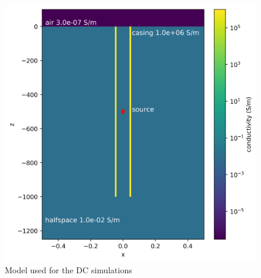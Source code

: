 \begin{figure}[htb]
    \begin{center}
    \includegraphics[width=0.4\columnwidth]{figures/kaufman_setup.png}
    \end{center}
\caption{Model used for the DC simulations}
\label{fig:kaufman_setup}
\end{figure}
